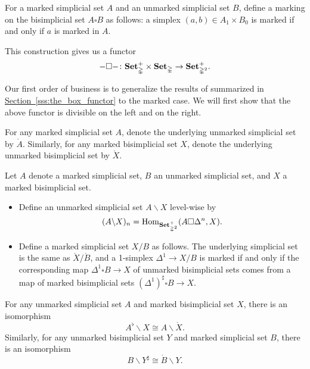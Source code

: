 \documentclass[main.tex]{subfiles}
\begin{document}
\begin{definition}
  For a marked simplicial set $A$ and an unmarked simplicial set $B$, define a marking on the bisimplicial set $A \square B$ as follows: a simplex $(a, b) \in A_{1} \times B_{0}$ is marked if and only if $a$ is marked in $A$.
\end{definition}

This construction gives us a functor
\begin{equation*}
  - \square -  \colon \mathbf{Set}_{\mathbb{\Delta}}^{+} \times \mathbf{Set}_{\mathbb{\Delta}} \to \mathbf{Set}_{\mathbb{\Delta}^{2}}^{+}.
\end{equation*}

Our first order of business is to generalize the results of \cite{qcats_vs_segal_spaces} summarized in \hyperref[sss:the_box_functor]{Section~\ref*{sss:the_box_functor}} to the marked case. We will first show that the above functor is divisible on the left and on the right.

\begin{notation}
  For any marked simplicial set $A$, denote the underlying unmarked simplicial set by $\mathring{A}$. Similarly, for any marked bisimplicial set $X$, denote the underlying unmarked bisimplicial set by $\mathring{X}$.
\end{notation}

\begin{definition}
  Let $A$ denote a marked simplicial set, $B$ an unmarked simplicial set, and $X$ a marked bisimplicial set.
  \begin{itemize}
    \item Define an unmarked simplicial set $A \backslash X$ level-wise by
      \begin{equation*}
        (A \backslash X)_{n} = \mathrm{Hom}_{\mathbf{Set}_{\mathbb{\Delta}^{2}}^{+}}(A \square \Delta^{n}, X).
      \end{equation*}

    \item Define a marked simplicial set $X / B$ as follows. The underlying simplicial set is the same as $\mathring{X} / \mathring{B}$, and a 1-simplex $\Delta^{1} \to X / B$ is marked if and only if the corresponding map $\Delta^{1} \square B \to X$ of unmarked bisimplicial sets comes from a map of marked bisimplicial sets $(\Delta^{1})^{\sharp} \square B \to X$.
  \end{itemize}
\end{definition}

\begin{example}
  For any unmarked simplicial set $A$ and marked bisimplicial set $X$, there is an isomorphism
  \begin{equation*}
    A^{\flat} \backslash X \cong A \backslash \mathring{X}.
  \end{equation*}
  Similarly, for any unmarked bisimplicial set $Y$ and marked simplicial set $B$, there is an isomorphism
  \begin{equation*}
    B \backslash Y^{\sharp} \cong \mathring{B} \backslash Y.
  \end{equation*}
\end{example}
\end{document}
